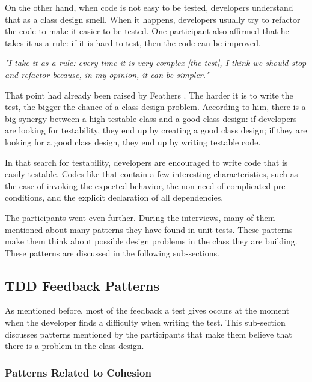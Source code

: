 \documentclass[times]{elsarticle}
\begin{document}
On the other hand, when code is not easy to be tested, developers understand that
as a class design smell. When it happens, developers usually try to refactor
the code to make it easier to be tested. One participant also affirmed that he
takes it as a rule: if it is hard to test, then the code can be improved.

\begin{framed}
	\textit{"I take it as a rule: every time it is very complex [the test],
	I think we should stop and refactor because, in my opinion, it can be simpler."}	
\end{framed}

That point had already been raised by Feathers \cite{feathers-synergy}.
The harder it is to write the test, the bigger the chance of a class design problem.
According to him, there is a big synergy between a high testable class and
a good class design: if developers are looking for testability, they end up by
creating a good class design; if they are looking for a good class design, they end
up by writing testable code.

In that search for testability, developers are encouraged to write code
that is easily testable. Codes like that contain a few interesting
characteristics, such as the ease of invoking the expected behavior,
the non need of complicated pre-conditions, and the explicit declaration
of all dependencies.

The participants went even further. During the interviews, many of them
mentioned about many patterns they have found in unit tests. These patterns
make them think about possible design problems in the class they are building.
These patterns are discussed in the following sub-sections.

\subsection{TDD Feedback Patterns}
\label{padroes-tdd}

As mentioned before, most of the feedback a test gives occurs at the moment
when the developer finds a difficulty when writing the test. This sub-section discusses
patterns mentioned by the participants that make them believe that there is a
problem in the class design.

\subsubsection{Patterns Related to Cohesion}
\end{document}
